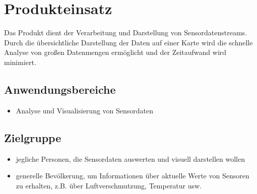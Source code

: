 \chapter{Produkteinsatz}
Das Produkt dient der Verarbeitung und Darstellung von Sensordatenstreams. Durch die übersichtliche Darstellung der Daten auf einer Karte wird die schnelle Analyse von großen Datenmengen ermöglicht und der Zeitaufwand wird minimiert.
\section{Anwendungsbereiche}
\begin{itemize}
	\item Analyse und Visualisierung von Sensordaten
\end{itemize}
\section{Zielgruppe}
\begin{itemize}
	\item jegliche Personen, die Sensordaten auswerten und visuell darstellen wollen
	\item generelle Bevölkerung, um Informationen über aktuelle Werte von Sensoren zu erhalten, z.B. über Luftverschmutzung, Temperatur usw.
\end{itemize}
